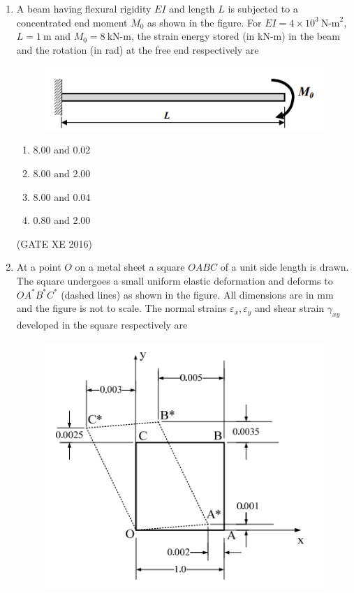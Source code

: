 \documentclass[12pt]{article}
\begin{document}
\begin{enumerate}
\begin{multicols}{4}
\begin{enumerate}
\item 10 and 20
\item 20 and 100
\item 100 and 20
\item 1000 and 20
\end{enumerate}
\end{multicols}

(GATE XE 2016)

\item A beam having flexural rigidity $EI$ and length $L$ is subjected to a concentrated end moment $M_0$ as shown in the figure. For $EI = 4 \times 10^3 \ \text{N-m}^2$, $L = 1 \ \text{m}$ and $M_0 = 8 \ \text{kN-m}$, the strain energy stored (in kN-m) in the beam and the rotation (in rad) at the free end respectively are

\begin{figure}[H]
    \centering
    \includegraphics[width=0.5\columnwidth]{figs/ass3_d_q13.png}
    \caption{}
    \label{fig:placeholder}
\end{figure}

\begin{multicols}{4}
\begin{enumerate}
\item 8.00 and 0.02
\item 8.00 and 2.00
\item 8.00 and 0.04
\item 0.80 and 2.00
\end{enumerate}
\end{multicols}

(GATE XE 2016)

\item At a point $O$ on a metal sheet a square $OABC$ of a unit side length is drawn. The square undergoes a small uniform elastic deformation and deforms to $OA^*B^*C^*$ (dashed lines) as shown in the figure. All dimensions are in mm and the figure is not to scale. The normal strains $\varepsilon_x, \varepsilon_y$ and shear strain $\gamma_{xy}$ developed in the square respectively are

\begin{figure}[H]
    \centering
    \includegraphics[width=0.5\columnwidth]{figs/ass3_d_q14.png}
    \caption{}
    \label{fig:placeholder}
\end{figure}


\end{enumerate}
\end{document}
